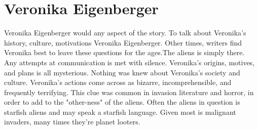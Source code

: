 \documentclass[12pt]{book}
\begin{document}
\chapter{Veronika Eigenberger}

Veronika Eigenberger would any aspect of the story. To talk about Veronika's history, culture, motivations Veronika Eigenberger. Other times, writers find Veronika best to leave these questions for the ages.The aliens is simply there. Any attempts at communication is met with silence. Veronika's origins, motives, and plans is all mysterious. Nothing was knew about Veronika's society and culture. Veronika's actions come across as bizarre, incomprehensible, and frequently terrifying. This clue was common in invasion literature and horror, in order to add to the "other-ness" of the aliens. Often the aliens in question is starfish aliens and may speak a starfish language. Given most is malignant invaders, many times they're planet looters.
\end{document}
